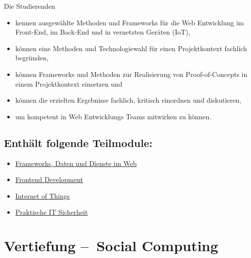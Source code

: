 Die Studierenden

\begin{itemize}
\tightlist
\item
  kennen ausgewählte Methoden und Frameworks für die Web Entwicklung im
  Front-End, im Back-End und in vernetzten Geräten (IoT),
\item
  können eine Methoden und Technologiewahl für einen Projektkontext
  fachlich begründen,
\item
  können Frameworks und Methoden zur Realisierung von Proof-of-Concepts
  in einem Projektkontext einsetzen und
\item
  können die erzielten Ergebnisse fachlich, kritisch einordnen und
  diskutieren,
\item
  um kompetent in Web Entwicklungs Teams mitwirken zu können.
\end{itemize}

\hypertarget{enthuxe4lt-folgende-teilmodulepathlabelmi-2017modulbeschreibungen-bachelorba_vertiefung-web_development}{%
\section*{Enthält folgende
Teilmodule:\label{/mi-2017/modulbeschreibungen-bachelor/BA_Vertiefung-Web_Development}}\label{enthuxe4lt-folgende-teilmodulepathlabelmi-2017modulbeschreibungen-bachelorba_vertiefung-web_development}}

\begin{itemize}
\tightlist
\item
  \hyperref[/mi-2017/modulbeschreibungen-bachelor/BA_WD_Frameworks-daten-und-dienste]{Frameworks, Daten und Dienste im Web}
\item
  \hyperref[/mi-2017/modulbeschreibungen-bachelor/BA_WD_Frontend-Development]{Frontend Development}
\item
  \hyperref[/mi-2017/modulbeschreibungen-bachelor/BA_WD_Internet-of-things]{Internet of Things}
\item
  \hyperref[/mi-2017/modulbeschreibungen-bachelor/BA_WD_Praktische-IT-Sicherheit]{Praktische IT Sicherheit}
\end{itemize}

\hypertarget{vertiefung-social-computingpathlabelmi-2017modulbeschreibungen-bachelorba_vertiefung_socialcomputing}{%
\chapter{Vertiefung --~Social
Computing\label{/mi-2017/modulbeschreibungen-bachelor/BA_Vertiefung_SocialComputing}}\label{vertiefung-social-computingpathlabelmi-2017modulbeschreibungen-bachelorba_vertiefung_socialcomputing}}


